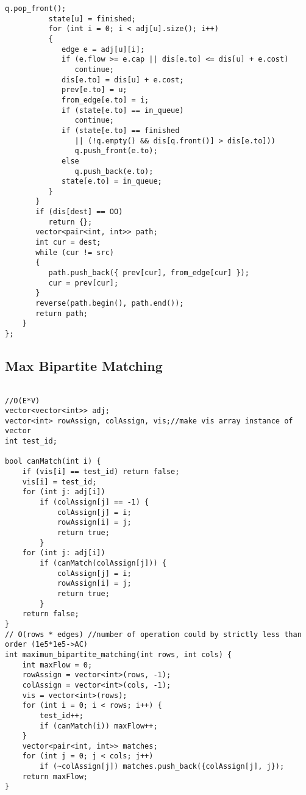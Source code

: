 \begin{lstlisting}[style=cpp]
          q.pop_front();  
          state[u] = finished;  
          for (int i = 0; i < adj[u].size(); i++)  
          {  
             edge e = adj[u][i];  
             if (e.flow >= e.cap || dis[e.to] <= dis[u] + e.cost)  
                continue;  
             dis[e.to] = dis[u] + e.cost;  
             prev[e.to] = u;  
             from_edge[e.to] = i;  
             if (state[e.to] == in_queue)  
                continue;  
             if (state[e.to] == finished  
                || (!q.empty() && dis[q.front()] > dis[e.to]))  
                q.push_front(e.to);  
             else  
                q.push_back(e.to);  
             state[e.to] = in_queue;  
          }  
       }  
       if (dis[dest] == OO)  
          return {};  
       vector<pair<int, int>> path;  
       int cur = dest;  
       while (cur != src)  
       {  
          path.push_back({ prev[cur], from_edge[cur] });  
          cur = prev[cur];  
       }  
       reverse(path.begin(), path.end());  
       return path;  
    }  
};
\end{lstlisting}

\subsection{Max Bipartite Matching}

\begin{lstlisting}[style=cpp]
  
//O(E*V)  
vector<vector<int>> adj;  
vector<int> rowAssign, colAssign, vis;//make vis array instance of vector  
int test_id;  
  
bool canMatch(int i) {  
    if (vis[i] == test_id) return false;  
    vis[i] = test_id;  
    for (int j: adj[i])  
        if (colAssign[j] == -1) {  
            colAssign[j] = i;  
            rowAssign[i] = j;  
            return true;  
        }  
    for (int j: adj[i])  
        if (canMatch(colAssign[j])) {  
            colAssign[j] = i;  
            rowAssign[i] = j;  
            return true;  
        }  
    return false;  
}  
// O(rows * edges) //number of operation could by strictly less than order (1e5*1e5->AC)  
int maximum_bipartite_matching(int rows, int cols) {  
    int maxFlow = 0;  
    rowAssign = vector<int>(rows, -1);  
    colAssign = vector<int>(cols, -1);  
    vis = vector<int>(rows);  
    for (int i = 0; i < rows; i++) {  
        test_id++;  
        if (canMatch(i)) maxFlow++;  
    }  
    vector<pair<int, int>> matches;  
    for (int j = 0; j < cols; j++)  
        if (~colAssign[j]) matches.push_back({colAssign[j], j});  
    return maxFlow;  
}
\end{lstlisting}

